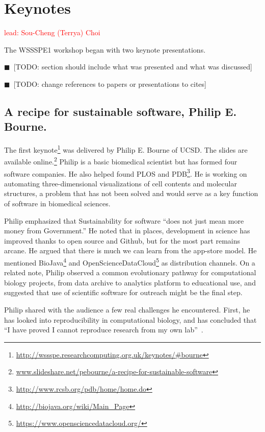 \documentclass[11pt, oneside]{amsart}
\newcommand{\todo}[1]{{\color{blue}$\blacksquare$~\textsf{[TODO: #1]}}}
\newcommand{\note}[1]{ {\textcolor{red}    { #1 }}}
\begin{document}
\section{Keynotes} \label{sec:keynotes}

\note{lead: Sou-Cheng (Terrya) Choi}

The WSSSPE1 workshop began with two keynote presentations.

\todo{section should include what was presented and what was discussed}

\todo{change references to papers or presentations to cites}

\subsection{A recipe for sustainable software, Philip E. Bourne.}

The first
keynote\footnote{\url{http://wssspe.researchcomputing.org.uk/keynotes/\#bourne}}
was delivered by Philip E. Bourne of UCSD. The slides are available
online.\footnote{\url{www.slideshare.net/pebourne/a-recipe-for-sustainable-software}}
Philip is a basic biomedical scientist but has formed four software
companies. He also helped found PLOS and
PDB\footnote{\url{http://www.rcsb.org/pdb/home/home.do}}.  He is
working on automating three-dimensional visualizations of cell
contents and molecular structures, a problem that has not been solved
and would serve as a key function of software in biomedical sciences.

Philip emphasized that Sustainability for software ``does not just
mean more money from Government.''  He noted that in places,
development in science has improved thanks to open source and Github,
but for the most part remains arcane. He argued that there is much we
can learn from the app-store model. He mentioned
BioJava\footnote{\url{http://biojava.org/wiki/Main_Page}} and
OpenScienceDataCloud\footnote{\url{https://www.opensciencedatacloud.org/}}
as distribution channels.  On a related note, Philip observed a common
evolutionary pathway for computational biology projects, from data
archive to analytics platform to educational use, and suggested that
use of scientific software for outreach might be the final step.

Philip shared with the audience a few real challenges he
encountered. First, he has looked into reproducibility in
computational biology, and has concluded that ``I have proved I cannot
reproduce research from my own lab''~\cite{Veretnik}.
\end{document}
